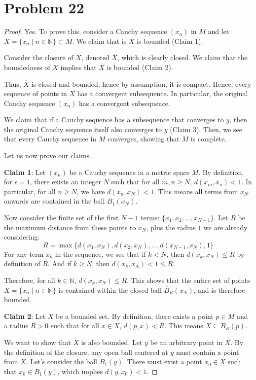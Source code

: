\documentclass[11pt]{article}
\newcommand{\bbN}{\mathbb{N}}
\renewcommand{\_}[1]{\underline{ #1 }}
\theoremstyle{definition}
\numberwithin{equation}{subsection}
\begin{document}
\section*{Problem 22}
\begin{proof}
Yes. To prove this, consider a Cauchy sequence $(x_n)$ in $M$ and let $X=\{x_n \mid n\in \bbN\} \subset M$. We claim that is $X$ is bounded (Claim 1). 

Consider the closure of $X$, denoted $\overline{X}$, which is clearly closed. We claim that the boundedness of $X$ implies that $\overline{X}$ is bounded (Claim 2).

Thus, $\overline{X}$ is closed and bounded, hence by assumption, it is compact. Hence, every sequence of points in $X$ has a convergent subsequence. In particular, the original Cauchy sequence $(x_n)$ has a convergent subsequence. 

We claim that if a Cauchy sequence has a subsequence that converges to $y$, then the original Cauchy sequence itself also converges to $y$ (Claim 3). Then, we see that every Cauchy sequence in $M$ converges, showing that $M$ is complete.

Let us now prove our claims.

\textbf{Claim 1}:  Let $(x_n)$ be a Cauchy sequence in a metric space $M$. By definition, for $\epsilon = 1$, there exists an integer $N$ such that for all $m, n \geq N$, $d(x_m, x_n) < 1$.
In particular, for all $n \geq N$, we have $d(x_n, x_N) < 1$. This means all terms from $x_N$ onwards are contained in the ball $B_1(x_N)$.

Now consider the finite set of the first $N-1$ terms: $\{x_1, x_2, \ldots, x_{N-1}\}$. Let $R$ be the maximum distance from these points to $x_N$, plus the radius $1$ we are already considering:
$$ R = \max\{d(x_1, x_N), d(x_2, x_N), \ldots, d(x_{N-1}, x_N), 1\} $$
For any term $x_k$ in the sequence, we see that if $k < N$, then $d(x_k, x_N) \leq R$ by definition of $R$. And if $k \geq N$, then $d(x_k, x_N) < 1 \leq R$.

Therefore, for all $k \in \mathbb{N}$, $d(x_k, x_N) \leq R$. This shows that the entire set of points $X = \{x_n \mid n \in \mathbb{N}\}$ is contained within the closed ball $\overline{B}_R(x_N)$, and is therefore bounded. 

\textbf{Claim 2}: Let $X$ be a bounded set. By definition, there exists a point $p \in M$ and a radius $R > 0$ such that for all $x \in X$, $d(p, x) < R$. This means $X \subseteq B_R(p)$.

We want to show that $\overline{X}$ is also bounded. Let $y$ be an arbitrary point in $\overline{X}$. By the definition of the closure, any open ball centered at $y$ must contain a point from $X$. Let's consider the ball $B_1(y)$. There must exist a point $x_0 \in X$ such that $x_0 \in B_1(y)$, which implies $d(y, x_0) < 1$.


\end{proof}
\end{document}
